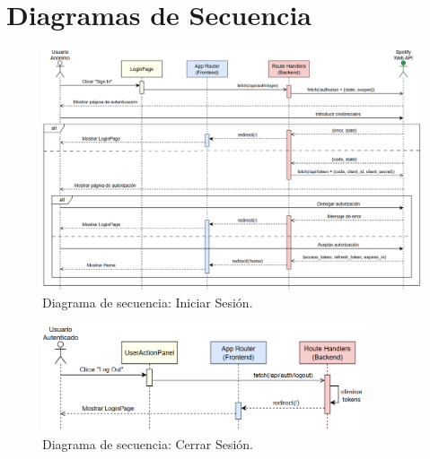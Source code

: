




\section{Diagramas de Secuencia}

\begin{figure}[H]
    \centering
    \includegraphics[width=\textwidth]{figures/diagramas_secuencia/ds_iniciar_sesion.png}
    \caption{Diagrama de secuencia: Iniciar Sesión.}
    \label{fig:ds_iniciar_sesion}
\end{figure}

\begin{figure}[H]
    \centering
    \includegraphics[width=0.85\textwidth]{figures/diagramas_secuencia/ds_cerrar_sesion.png}
    \caption{Diagrama de secuencia: Cerrar Sesión.}
    \label{fig:ds_cerrar_sesion}
\end{figure}

